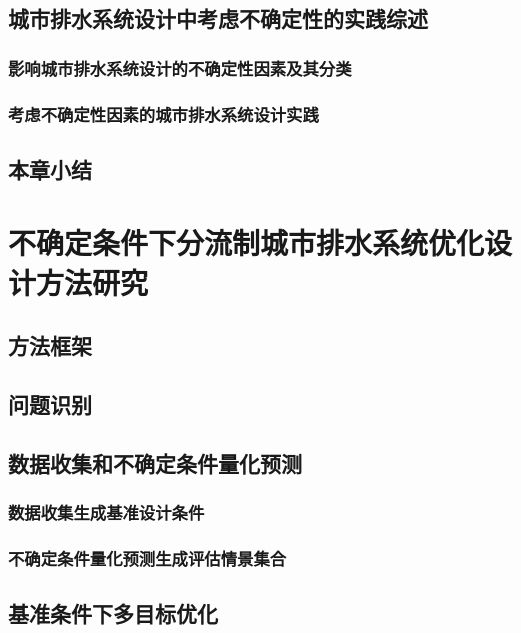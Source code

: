 \documentclass[degree=doctor]{sysuthesis}
\begin{document}
\clearpage
\setcounter{page}{27}
\section{城市排水系统设计中考虑不确定性的实践综述}
\subsection{影响城市排水系统设计的不确定性因素及其分类}

\clearpage
\setcounter{page}{28}
\subsection{考虑不确定性因素的城市排水系统设计实践}

\clearpage
\setcounter{page}{38}
\section{本章小结}


\clearpage
\setcounter{page}{40}
\chapter{不确定条件下分流制城市排水系统优化设计方法研究}
\section{方法框架}

\clearpage
\setcounter{page}{41}
\section{问题识别}

\clearpage
\setcounter{page}{46}
\section{数据收集和不确定条件量化预测}
\subsection{数据收集生成基准设计条件}

\clearpage
\setcounter{page}{47}
\subsection{不确定条件量化预测生成评估情景集合}

\clearpage
\setcounter{page}{53}
\section{基准条件下多目标优化}
\end{document}
